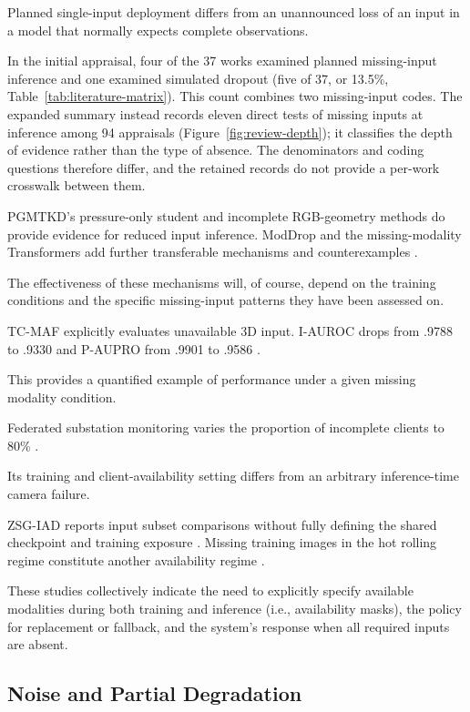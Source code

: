 Planned single-input deployment differs from an unannounced loss of an input in a model that
normally expects complete observations.

In the initial appraisal, four of the 37 works examined planned missing-input inference and one examined simulated dropout (five of 37, or 13.5\%, Table~\ref{tab:literature-matrix}). This count combines two missing-input codes. The expanded summary instead records eleven direct tests of missing inputs at inference among 94 appraisals (Figure~\ref{fig:review-depth}); it classifies the depth of evidence rather than the type of absence. The denominators and coding questions therefore differ, and the retained records do not provide a per-work crosswalk between them.

PGMTKD's pressure-only student and incomplete RGB-geometry methods do provide evidence for reduced
input inference. ModDrop and the missing-modality Transformers add further transferable mechanisms
and counterexamples \parencite{Li2025PGMTKD,Sui2026Incomplete,P005,P016}.

The effectiveness of these mechanisms will, of course, depend on the training conditions and the
specific missing-input patterns they have been assessed on.

TC-MAF explicitly evaluates unavailable 3D input. I-AUROC drops from .9788 to .9330 and P-AUPRO from
.9901 to .9586 \parencite[Table~3]{P026}.

This provides a quantified example of performance under a given missing modality condition.

Federated substation monitoring varies the proportion of incomplete clients to 80\% \parencite[Figure~8]{P051}.

Its training and client-availability setting differs from an arbitrary inference-time camera
failure.

ZSG-IAD reports input subset comparisons without fully defining the shared checkpoint and training
exposure \parencite{P025}. Missing training images in the hot rolling regime constitute another
availability regime \parencite{Ma2025A}.

These studies collectively indicate the need to explicitly specify available modalities during both
training and inference (i.e., availability masks), the policy for replacement or fallback, and the
system's response when all required inputs are absent.

\subsection{Noise and Partial Degradation}

